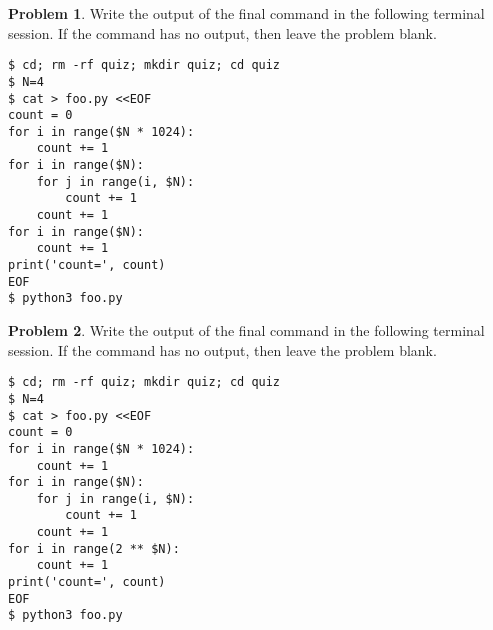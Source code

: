 \documentclass[10pt]{article}
\theoremstyle{definition}
\newtheorem{problem}{Problem}
\begin{document}
\newpage
\begin{problem}
    Write the output of the final command in the following terminal session.
    If the command has no output, then leave the problem blank.
\end{problem}
\begin{lstlisting}
$ cd; rm -rf quiz; mkdir quiz; cd quiz
$ N=4
$ cat > foo.py <<EOF
count = 0
for i in range($N * 1024):
    count += 1
for i in range($N):
    for j in range(i, $N):
        count += 1
    count += 1
for i in range($N):
    count += 1
print('count=', count)
EOF
$ python3 foo.py
\end{lstlisting}
\vspace{0.4in}


\newpage
\begin{problem}
    Write the output of the final command in the following terminal session.
    If the command has no output, then leave the problem blank.
\end{problem}
\begin{lstlisting}
$ cd; rm -rf quiz; mkdir quiz; cd quiz
$ N=4
$ cat > foo.py <<EOF
count = 0
for i in range($N * 1024):
    count += 1
for i in range($N):
    for j in range(i, $N):
        count += 1
    count += 1
for i in range(2 ** $N):
    count += 1
print('count=', count)
EOF
$ python3 foo.py
\end{lstlisting}
\vspace{0.4in}
\end{document}
